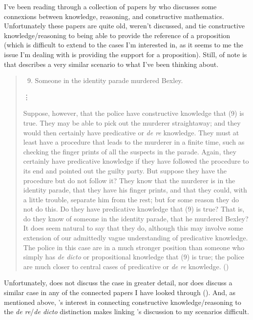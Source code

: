 \documentclass[10pt]{article}
\begin{document}
I've been reading through a collection of papers by \citeauthor{Over:1983ab} who discusses some connexions between knowledge, reasoning, and constructive mathematics.
Unfortunately these papers are quite old, weren't discussed, and tie constructive knowledge/reasoning to being able to provide the reference of a proposition (which is difficult to extend to the cases I'm interested in, as it seems to me the issue I'm dealing with is providing the support for a proposition).
Still, of note is that \citeauthor{Over:1983ab} describes a very similar scenario to what I've been thinking about.

\begin{quote}
  \begin{enumerate}[label=(\arabic*)]
    \setcounter{enumi}{8}
  \item Someone in the identity parade murdered Bexley.
  \end{enumerate}

  \mbox{}\hfill\vdots\hfill\mbox{}

  Suppose, however, that the police have constructive knowledge that (9) is true.
  They may be able to pick out the murderer straightaway; and they would then certainly have predicative or \emph{de re} knowledge.
  They must at least have a procedure that leads to the murderer in a finite time, such as checking the finger prints of all the suspects in the parade.
  Again, they certainly have predicative knowledge if they have followed the procedure to its end and pointed out the guilty party.
  But suppose they have the procedure but do not follow it?
  They know that the murderer is in the identity parade, that they have his finger prints, and that they could, with a little trouble, separate him from the rest; but for some reason they do not do this.
  Do they have predicative knowledge that (9) is true?
  That is, do they know of someone in the identity parade, that he murdered Bexley?
  It does seem natural to say that they do, although this may involve some extension of our admittedly vague understanding of predicative knowledge.
  The police in this case are in a much stronger position than someone who simply has \emph{de dicto} or propositional knowledge that (9) is true; the police are much closer to central cases of predicative or \emph{de re} knowledge.\nolinebreak
  \mbox{}\hfill\mbox{(\citeyear[143--144]{Over:1983ab})}
\end{quote}

Unfortunately, \citeauthor{Over:1983ab} does not discuss the case in greater detail, nor does \citeauthor{Over:1983ab} discuss a similar case in any of the connected papers I have looked through (\citeyear{Millican:1990aa,Over:1987aa,Over:1986aa,Over:1985aa,Over:1983ab,Over:1983aa}).
And, as mentioned above, \citeauthor{Over:1983ab}'s interest in connecting constructive knowledge/reasoning to the \emph{de re}/\emph{de dicto} distinction makes linking \citeauthor{Over:1983ab}'s discussion to my scenarios difficult.
\end{document}
